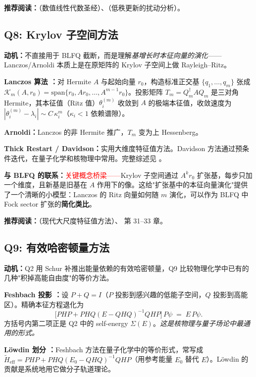 \documentclass{article}
\begin{document}
\textbf{推荐阅读：}\cite{Golub_VanLoan_2013}（数值线性代数圣经）、\cite{Stewart_Sun_1990}（低秩更新的扰动分析）。

\subsection{Q8: Krylov 子空间方法}

\textbf{动机：}不直接用于 BLFQ 截断，而是理解\emph{基增长时本征向量的演化}——Lanczos/Arnoldi 本质上是在原矩阵的 Krylov 子空间上做 Rayleigh--Ritz。

\textbf{Lanczos 算法 \cite{Lanczos_1950}：}对 Hermite $A$ 与起始向量 $r_{0}$，构造标准正交基 $\{q_{1},\dots,q_{m}\}$ 张成 $\mathcal{K}_{m}(A,r_{0})=\mathrm{span}\{r_{0},Ar_{0},\dots,A^{m-1}r_{0}\}$。投影矩阵 $T_{m}=Q_{m}^{\dagger}AQ_{m}$ 是三对角 Hermite，其本征值（Ritz 值）$\theta_{i}^{(m)}$ 收敛到 $A$ 的极端本征值，收敛速度为 $|\theta_{i}^{(m)}-\lambda_{i}|\sim C\,\kappa_{i}^{m}$（$\kappa_{i}<1$ 依赖谱隙）\cite{Saad_1980_Lanczos}。

\textbf{Arnoldi：}Lanczos 的非 Hermite 推广，$T_{m}$ 变为上 Hessenberg。

\textbf{Thick Restart / Davidson：}实用大维度特征值方法。Davidson 方法通过预条件迭代，在量子化学和核物理中常用。完整综述见 \cite{Saad_2011}。

\textbf{与 BLFQ 的联系：}\textcolor{red}{关键概念桥梁——}Krylov 子空间通过 $A^{k}r_{0}$ 扩张基，每步只加一个维度，且新基是旧基在 $A$ 作用下的像。这给"扩张基中的本征向量演化"提供了一个清晰的小模型：Lanczos 的 Ritz 向量如何随 $m$ 演化，可以作为 BLFQ 中 Fock sector 扩张的\textbf{简化类比}。

\textbf{推荐阅读：}\cite{Saad_2011}（现代大尺度特征值方法）、\cite{Trefethen_Bau_1997} 第 31--33 章。

\subsection{Q9: 有效哈密顿量方法}

\textbf{动机：}Q2 用 Schur 补推出能量依赖的有效哈密顿量，Q9 比较物理化学中已有的几种"积掉高能自由度"的等价方法。

\textbf{Feshbach 投影 \cite{Feshbach_1958}：}设 $P+Q=I$（$P$ 投影到感兴趣的低能子空间，$Q$ 投影到高能区）。精确本征方程退化为
\[
\bigl[PHP + PHQ(E-QHQ)^{-1}QHP\bigr]\,P\psi \;=\; E\,P\psi.
\]
方括号内第二项正是 Q2 中的 self-energy $\Sigma(E)$。\emph{这是核物理与量子场论中最通用的形式。}

\textbf{L\"owdin 划分 \cite{Lowdin_1951}：}Feshbach 方法在量子化学中的等价形式，常写成 $\tilde{H}_{\mathrm{eff}}=PHP+PHQ(E_{0}-QHQ)^{-1}QHP$（用参考能量 $E_{0}$ 替代 $E$）。L\"owdin 的贡献是系统地用它做分子轨道理论。
\end{document}
